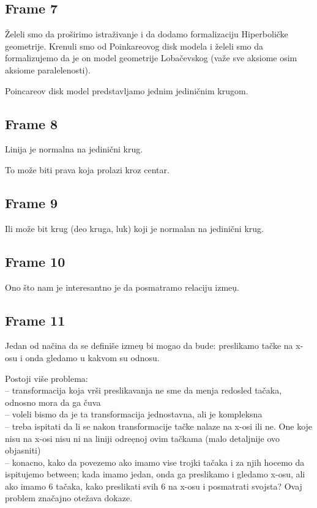 \documentclass{article}
\begin{document}
\subsection{Frame 7}

\v Zeleli smo da pro\v sirimo istra\v zivanje i da dodamo formalizaciju Hiperboli\v cke geometrije.
Krenuli smo od Poinkareovog disk modela i \v zeleli smo da formalizujemo da je on
model geometrije Loba\v cevskog (va\v ze sve aksiome osim aksiome paralelenosti).

Poincareov disk model predstavljamo jednim jedini\v cnim krugom.

\subsection{Frame 8}
Linija je normalna na jedini\v cni krug.

To mo\v ze biti prava koja prolazi kroz centar.

\subsection{Frame 9}

Ili mo\v ze bit krug (deo kruga, luk) koji je normalan na jedini\v cni krug.

\subsection{Frame 10}
Ono \v sto nam je interesantno je da posmatramo relaciju izme\d u.

\subsection{Frame 11}

Jedan od na\v cina da se defini\v se izme\d u bi mogao da bude: preslikamo ta\v cke na x-osu i onda gledamo u kakvom su odnosu.

Postoji vi\v se problema: \\
-- transformacija koja vr\v si preslikavanja ne sme da menja redosled ta\v 
   caka, odnosno mora da ga \v cuva \\
-- voleli bismo da je ta transformacija jednostavna, ali je kompleksna \\
-- treba ispitati da li se nakon transformacije ta\v cke nalaze na x-osi ili ne. 
   One koje nisu na x-osi nisu ni na liniji odre\d enoj ovim ta\v ckama (malo 
detaljnije ovo objasniti) \\
-- konacno, kako da povezemo ako imamo vise trojki ta\v caka i za njih hocemo da ispitujemo between; kada imamo jedan, onda ga preslikamo i gledamo x-osu, ali ako imamo 6 ta\v caka,
   kako preslikati svih 6 na x-osu i posmatrati svojsta? Ovaj problem zna\v cajno ote\v zava dokaze.
   
\end{document}
